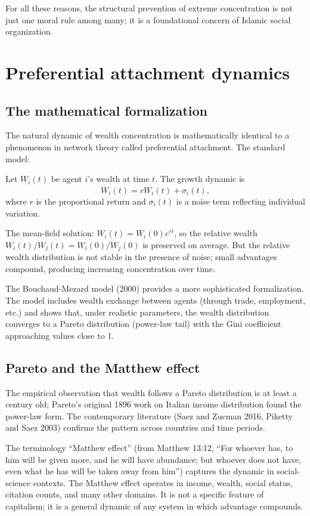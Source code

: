 For all these reasons, the structural prevention of extreme
concentration is not just one moral rule among many; it is a
foundational concern of Islamic social organization.

\section{Preferential attachment dynamics}
\label{sec:perm-attachment}

\subsection{The mathematical formalization}

The natural dynamic of wealth concentration is mathematically
identical to a phenomenon in network theory called preferential
attachment. The standard model:

Let $W_i(t)$ be agent $i$'s wealth at time $t$. The growth dynamic
is
\[
    \dot{W_i}(t) = r W_i(t) + \sigma_i(t),
\]
where $r$ is the proportional return and $\sigma_i(t)$ is a noise
term reflecting individual variation.

The mean-field solution: $W_i(t) = W_i(0) e^{rt}$, so the
relative wealth $W_i(t) / W_j(t) = W_i(0)/W_j(0)$ is preserved on
average. But the relative wealth distribution is not stable in the
presence of noise; small advantages compound, producing increasing
concentration over time.

The Bouchaud-Mezard model (2000) provides a more sophisticated
formalization. The model includes wealth exchange between agents
(through trade, employment, etc.) and shows that, under realistic
parameters, the wealth distribution converges to a Pareto
distribution (power-law tail) with the Gini coefficient
approaching values close to 1.

\subsection{Pareto and the Matthew effect}

The empirical observation that wealth follows a Pareto
distribution is at least a century old; Pareto's original 1896
work on Italian income distribution found the power-law form. The
contemporary literature (Saez and Zucman 2016, Piketty and Saez
2003) confirms the pattern across countries and time periods.

The terminology ``Matthew effect'' (from Matthew 13:12, ``For
whoever has, to him will be given more, and he will have
abundance; but whoever does not have, even what he has will be
taken away from him'') captures the dynamic in social-science
contexts. The Matthew effect operates in income, wealth, social
status, citation counts, and many other domains. It is not a
specific feature of capitalism; it is a general dynamic of any
system in which advantage compounds.

